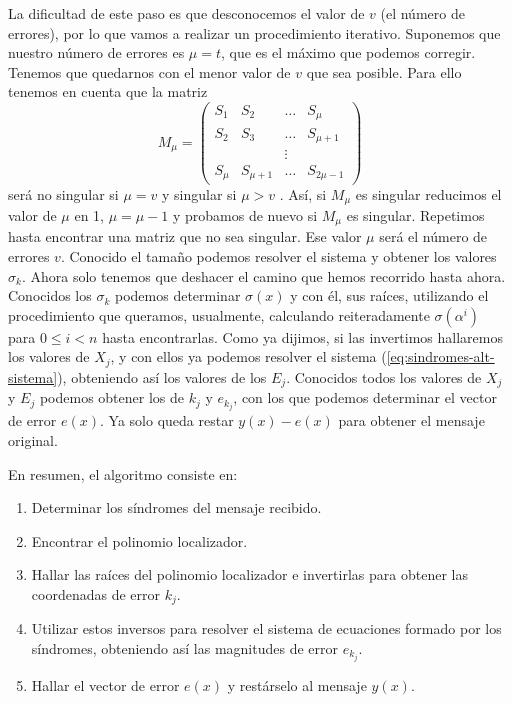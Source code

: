 La dificultad de este paso es que desconocemos el valor de \(v\) (el número de errores), por lo que vamos a realizar un procedimiento iterativo.
Suponemos que nuestro número de errores es \(\mu = t\), que es el máximo que podemos corregir.
Tenemos que quedarnos con el menor valor de \(v\) que sea posible.
Para ello tenemos en cuenta que la matriz
\[
  M_{\mu} = \begin{pmatrix}
    S_1 & S_2 & \dots & S_{\mu} \\
    S_2 & S_3 & \dots & S_{\mu + 1}\\
     & & \vdots & \\
    S_{\mu} & S_{\mu+1} & \dots & S_{2\mu - 1}
  \end{pmatrix}
\] será no singular si \(\mu = v\) y singular si \(\mu > v\) \parencite[Lema 5.4.2]{huffman_fundamentals_2003}.
Así, si \(M_{\mu}\) es singular reducimos el valor de \(\mu\) en 1, \(\mu = \mu - 1\) y probamos de nuevo si \(M_{\mu}\) es singular.
Repetimos hasta encontrar una matriz que no sea singular.
Ese valor \(\mu\) será el número de errores \(v\).
Conocido el tamaño podemos resolver el sistema y obtener los valores \(\sigma_k\).
Ahora solo tenemos que deshacer el camino que hemos recorrido hasta ahora.
Conocidos los \(\sigma_k\) podemos determinar \(\sigma(x)\) y con él, sus raíces, utilizando el procedimiento que queramos, usualmente, calculando reiteradamente \(\sigma(\alpha^i)\) para \(0 \leq i < n\) hasta encontrarlas.
Como ya dijimos, si las invertimos hallaremos los valores de \(X_j\), y con ellos ya podemos resolver el sistema (\ref{eq:sindromes-alt-sistema}), obteniendo así los valores de los \(E_j\).
Conocidos todos los valores de \(X_j\) y \(E_j\) podemos obtener los de \(k_j\) y \(e_{k_j}\), con los que podemos determinar el vector de error \(e(x)\).
Ya solo queda restar \(y(x) - e(x)\) para obtener el mensaje original.

En resumen, el algoritmo consiste en: \begin{enumerate}
  \item Determinar los síndromes del mensaje recibido.
  \item Encontrar el polinomio localizador.
  \item Hallar las raíces del polinomio localizador e invertirlas para obtener las coordenadas de error \(k_j\).
  \item Utilizar estos inversos para resolver el sistema de ecuaciones formado por los síndromes, obteniendo así las magnitudes de error \(e_{k_j}\).
  \item Hallar el vector de error \(e(x)\) y restárselo al mensaje \(y(x)\).
\end{enumerate}

